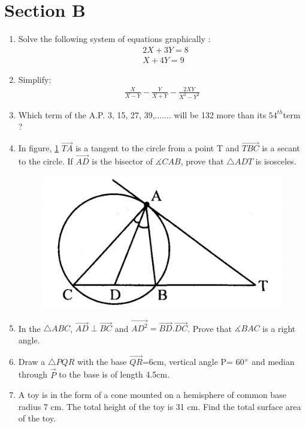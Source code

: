 \documentclass[journal,12pt,twocolumn]{IEEEtran}
\renewcommand\thesection{\arabic{section}}
\begin{document}
\section{Section B}
\renewcommand{\theequation}{\theenumi}
\begin{enumerate}[label=\thesection.\arabic*.,ref=\thesection.\theenumi]
\item Solve the following system of equations graphically :
\begin{align}
&2X+3Y=8\nonumber \\ &X+4Y=9 \nonumber
\end{align}

\item Simplify:
\begin{align}
\displaystyle\frac{X}{X-Y}-\displaystyle\frac{Y}{X+Y}-\displaystyle\frac{2XY}{X^2-Y^2} \nonumber
\end{align}

\item Which term of the A.P. 3, 15, 27, 39,....... will be 132 more than its $54^{th} $term ?

\item In figure, \ref{fig6} $\vec{TA}$ is a tangent to the circle from a point T and $\vec{TBC}$ is a secant to the circle. If $\vec{AD}$ is the bisector of $\measuredangle{CAB} $, prove that $\triangle{ADT} $ is isosceles.
\begin{figure}[h!]
	\centering
    \includegraphics[width=0.5\columnwidth,center]{./fig/6.png}
    \caption{}
    \label{fig6}
\end{figure}
 
 \item In  the $\triangle{ABC}$, $\vec{AD} \perp \vec{BC}$ and $\vec{AD^2}= \vec{BD}.\vec{DC}$.  Prove that $\measuredangle{BAC}$ is a right angle.
  
 \item Draw a $\triangle{PQR}$ with the base $\vec{QR}$=6cm, vertical angle P= 60$\degree$ and median through $\vec{P}$ to the base is of length 4.5cm.
 
 \item A toy is in the form of a cone mounted on a hemisphere of common base radius 7 cm. The total height of the toy is 31 cm. Find the total surface area of the toy.
 

\end{enumerate}
\end{document}
